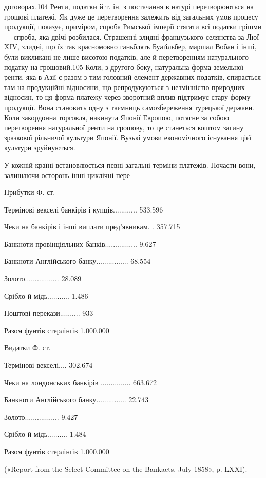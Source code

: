 договорах.104 Ренти, податки й т. ін. з постачання в натурі перетворюються
на грошові платежі. Як дуже це перетворення
залежить від загальних умов процесу продукції, показує, приміром,
спроба Римської імперії стягати всі податки грішми —
спроба, яка двічі розбилася. Страшенні злидні французького
селянства за Люї XIV, злидні, що їх так красномовно ганьблять
Буаґільбер, маршал Вобан і інші, були викликані не лише висотою
податків, але й перетворенням натурального податку на
грошовий.105 Коли, з другого боку, натуральна форма земельної
ренти, яка в Азії є разом з тим головний елемент державних
податків, спирається там на продукційні відносини, що репродукуються
з незмінністю природних відносин, то ця форма платежу
через зворотний вплив підтримує стару форму продукції. Вона
становить одну з таємниць самозбереження турецької держави.
Коли закордонна торговля, накинута Японії Европою, потягне
за собою перетворення натуральної ренти на грошову, то це
станеться коштом загину зразкової рільничої культури Японії.
Вузькі умови економічного існування цієї культури зруйнуються.

У кожній країні встановлюється певні загальні терміни платежів.
Почасти вони, залишаючи осторонь інші циклічні пере-

Прибутки    Ф. ст.

Термінові векселі банкірів
і купців............ 533.596

Чеки на банкірів і інші
виплати пред’явникам. . 357.715

Банкноти провінціяльних
банків................ 9.627

Банкноти Англійського
банку................ 68.554

Золото................. 28.089

Срібло й мідь........... 1.486

Поштові перекази.......... 933

Разом фунтів стерлінґів 1.000.000

Видатки    Ф. ст.

Термінові векселі.... 302.674

Чеки на лондонських банкірів
............... 663.672

Банкноти Англійського
банку............... 22.743

Золото................. 9.427

Срібло й мідь.......... 1.484

Разом фунтів стерлінґів 1.000.000

(«Report from the Select Committee on the Bankacts. July 1858»,
p. LXXI).


